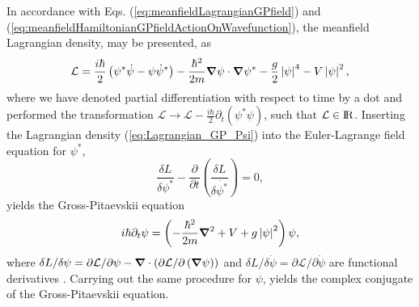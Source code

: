 \documentclass[twocolumn, nofootinbib, nobibnotes, amsmath,amssymb,aps, pra, floatfix]{revtex4-1}
\newcommand{\gv}[1]{\ensuremath{\mbox{\boldmath$ #1 $}}} %
\newcommand{\abs}[1]{\left| #1 \right|} %
\newcommand{\pd}[2]{\frac{\partial #1}{\partial #2}} %
\newcommand{\grad}[1]{\gv{\nabla} #1} %
\begin{document}
In accordance with Eqs. (\ref{eq:meanfieldLagrangianGPfield}) and (\ref{eq:meanfieldHamiltonianGPfieldActionOnWavefunction}), the meanfield Lagrangian density, may be presented, as
\begin{equation}
  \mathcal{L} = \frac{i\hbar}{2}\left(\psi^*\dot{\psi}-\psi\dot{\psi}^*\right) -\frac{\hbar^2}{2m}\grad{\psi}\cdot\grad{\psi}^* -\frac{g}{2}\abs{\psi}^4-V\abs{\psi}^2,
\label{eq:Lagrangian_GP_Psi}
\end{equation}
where we have denoted partial differentiation with respect to time by a dot and performed the transformation $\mathcal{L}\rightarrow\mathcal{L}-\frac{i\hbar}{2}\partial_t\left( \psi^*\psi \right)$, such that $\mathcal{L}\in{\rm I\!R}$.
Inserting the Lagrangian density (\ref{eq:Lagrangian_GP_Psi}) into the Euler-Lagrange field equation for $\psi^*$,
\begin{equation}
  \frac{\delta L}{\delta\psi^*}-\pd{}{t}\left(\frac{\delta L}{\delta\dot{\psi^*}}\right)=0,
  \label{}
\end{equation}
yields the Gross-Pitaevskii equation 
\begin{equation}
  i\hbar\partial_t\psi=\left( -\frac{\hbar^2}{2m}\grad{}^2+V+g\abs{\psi}^2 \right)\psi,
  \label{eq:GPequation}
\end{equation}
where $\delta L/\delta\psi=\partial\mathcal{L}/\partial\psi-\grad{}\cdot\left( \partial\mathcal{L}/\partial\left( \grad{}\psi \right) \right)$ and $\delta L/\delta\dot{\psi}=\partial\mathcal{L}/\partial\dot{\psi}$ are functional derivatives \cite{mercier2004analytical,cohen1992atom}.
Carrying out the same procedure for $\psi$, yields the complex conjugate of the Gross-Pitaevskii equation.
\end{document}
